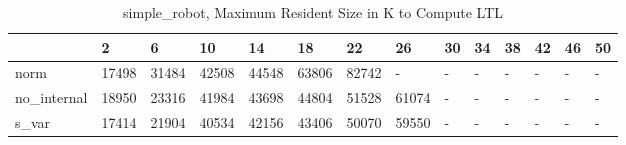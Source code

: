 \begin{table}
\caption{simple_robot, Maximum Resident Size in K to Compute LTL}
\label{simple_robot_LTL_size}
\begin{tabular}{llllllllllllll}
\toprule
 & 2 & 6 & 10 & 14 & 18 & 22 & 26 & 30 & 34 & 38 & 42 & 46 & 50 \\
\midrule
norm & 17498 & 31484 & 42508 & 44548 & 63806 & 82742 & - & - & - & - & - & - & - \\
no_internal & 18950 & 23316 & 41984 & 43698 & 44804 & 51528 & 61074 & - & - & - & - & - & - \\
s_var & 17414 & 21904 & 40534 & 42156 & 43406 & 50070 & 59550 & - & - & - & - & - & - \\
\bottomrule
\end{tabular}
\end{table}
